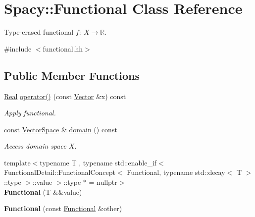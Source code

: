 \hypertarget{classSpacy_1_1Functional}{}\section{Spacy\+:\+:Functional Class Reference}
\label{classSpacy_1_1Functional}


Type-\/erased functional $f:\ X \to \mathbb{R} $.  




{\ttfamily \#include $<$functional.\+hh$>$}

\subsection*{Public Member Functions}
\begin{DoxyCompactItemize}
\item 
\hyperlink{classSpacy_1_1Real}{Real} \hyperlink{classSpacy_1_1Functional_af51f903133f2fbf92cf12f790e429919}{operator()} (const \hyperlink{classSpacy_1_1Vector}{Vector} \&x) const \hypertarget{classSpacy_1_1Functional_af51f903133f2fbf92cf12f790e429919}{}\label{classSpacy_1_1Functional_af51f903133f2fbf92cf12f790e429919}

\begin{DoxyCompactList}\small\item\em Apply functional. \end{DoxyCompactList}\item 
const \hyperlink{classSpacy_1_1VectorSpace}{Vector\+Space} \& \hyperlink{classSpacy_1_1Functional_a6f4ada552c025579bcce852316a071be}{domain} () const \hypertarget{classSpacy_1_1Functional_a6f4ada552c025579bcce852316a071be}{}\label{classSpacy_1_1Functional_a6f4ada552c025579bcce852316a071be}

\begin{DoxyCompactList}\small\item\em Access domain space $X$. \end{DoxyCompactList}\item 
{\footnotesize template$<$typename T , typename std\+::enable\+\_\+if$<$ Functional\+Detail\+::\+Functional\+Concept$<$ Functional, typename std\+::decay$<$ T $>$\+::type $>$\+::value $>$\+::type $\ast$  = nullptr$>$ }\\{\bfseries Functional} (T \&\&value)\hypertarget{classSpacy_1_1Functional_a7cda76dbec505fdf667e6023c064bde9}{}\label{classSpacy_1_1Functional_a7cda76dbec505fdf667e6023c064bde9}

\item 
{\bfseries Functional} (const \hyperlink{classSpacy_1_1Functional}{Functional} \&other)\hypertarget{classSpacy_1_1Functional_a412ab757206e9c17a5d3be5ad119f259}{}\label{classSpacy_1_1Functional_a412ab757206e9c17a5d3be5ad119f259}


\end{DoxyCompactItemize}
